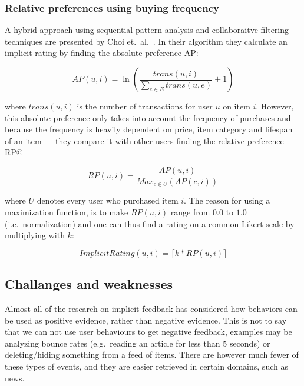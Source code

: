 
\subsubsection{Relative preferences using buying frequency}

A hybrid approach using sequential pattern analysis and collaboraitve filtering
techniques are presented by Choi et.\ al.~\cite{choi2012hybrid}. In their
algorithm they calculate an implicit rating by finding the absolute preference
AP\@:

\begin{equation}
  AP(u,i) = \ln(\frac{trans(u,i)}{\sum_{e \in E}{trans(u, e)}} + 1)
\end{equation}


where $trans(u,i)$ is the number of transactions for user $u$ on item $i$.
However, this absolute preference only takes into account the frequency of
purchases and because the frequency is heavily dependent on price, item
category and lifespan of an item — they compare it with other users finding the
relative preference RP@\:

\begin{equation}
  RP(u,i) = \frac{AP(u,i)}{Max_{c \in U}(AP(c,i))}
\end{equation}

where $U$ denotes every user who purchased item $i$. The reason for using a
maximization function, is to make $RP(u,i)$ range from $0.0$ to $1.0$ (i.e.\
normalization) and one can thus find a rating on a common Likert scale by
multiplying with $k$:

\begin{equation}
  ImplicitRating(u,i) = \lceil k * RP(u,i) \rceil
\end{equation}


\subsection{Challanges and weaknesses}
\label{implicit-weaknesses}

Almost all of the research on implicit feedback has considered how behaviors
can be used as positive evidence, rather than negative evidence. This is not to
say that we can not use user behaviours to get negative feedback, examples may
be analyzing bounce rates (e.g.\ reading an article for less than 5 seconds) or
deleting/hiding something from a feed of items. There are however much fewer of
these types of events, and they are easier retrieved in certain domains, such
as news.


